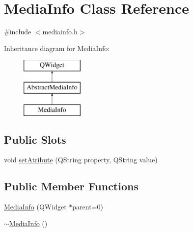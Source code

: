 \hypertarget{class_media_info}{\section{Media\-Info Class Reference}
\label{class_media_info}
}


{\ttfamily \#include $<$mediainfo.\-h$>$}

Inheritance diagram for Media\-Info\-:\begin{figure}[H]
\begin{center}
\leavevmode
\includegraphics[height=3.000000cm]{class_media_info}
\end{center}
\end{figure}
\subsection*{Public Slots}
\begin{DoxyCompactItemize}
\item 
void \hyperlink{class_media_info_ac1a807582e0830e8f7a6167257a8b69a}{set\-Atribute} (Q\-String property, Q\-String value)
\end{DoxyCompactItemize}
\subsection*{Public Member Functions}
\begin{DoxyCompactItemize}
\item 
\hyperlink{class_media_info_a80b7af5a999c7ab31e4207c39ccb8833}{Media\-Info} (Q\-Widget $\ast$parent=0)
\item 
\hyperlink{class_media_info_a28c974ae197fcb8bd2e083c7cb4cb99c}{$\sim$\-Media\-Info} ()
\end{DoxyCompactItemize}


